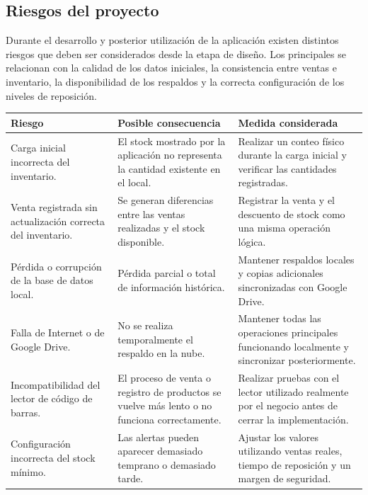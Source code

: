 \documentclass[10pt,a4paper]{article}
\begin{document}
\subsection{Riesgos del proyecto}

Durante el desarrollo y posterior utilización de la aplicación existen distintos riesgos que deben ser considerados desde la etapa de diseño. Los principales se relacionan con la calidad de los datos iniciales, la consistencia entre ventas e inventario, la disponibilidad de los respaldos y la correcta configuración de los niveles de reposición.

\begin{longtable}{|p{}|p{}|p{}|}
\hline
\textbf{Riesgo} & \textbf{Posible consecuencia} & \textbf{Medida considerada} \\
\hline

Carga inicial incorrecta del inventario. &
El stock mostrado por la aplicación no representa la cantidad existente en el local. &
Realizar un conteo físico durante la carga inicial y verificar las cantidades registradas. \\
\hline

Venta registrada sin actualización correcta del inventario. &
Se generan diferencias entre las ventas realizadas y el stock disponible. &
Registrar la venta y el descuento de stock como una misma operación lógica. \\
\hline

Pérdida o corrupción de la base de datos local. &
Pérdida parcial o total de información histórica. &
Mantener respaldos locales y copias adicionales sincronizadas con Google Drive. \\
\hline

Falla de Internet o de Google Drive. &
No se realiza temporalmente el respaldo en la nube. &
Mantener todas las operaciones principales funcionando localmente y sincronizar posteriormente. \\
\hline

Incompatibilidad del lector de código de barras. &
El proceso de venta o registro de productos se vuelve más lento o no funciona correctamente. &
Realizar pruebas con el lector utilizado realmente por el negocio antes de cerrar la implementación. \\
\hline

Configuración incorrecta del stock mínimo. &
Las alertas pueden aparecer demasiado temprano o demasiado tarde. &
Ajustar los valores utilizando ventas reales, tiempo de reposición y un margen de seguridad. \\
\hline
\end{longtable}
\end{document}
